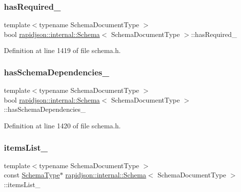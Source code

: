 \subsubsection{\texorpdfstring{hasRequired\_}{hasRequired\_}}
{\footnotesize\ttfamily template$<$typename Schema\+Document\+Type $>$ \\
bool \mbox{\hyperlink{classrapidjson_1_1internal_1_1_schema}{rapidjson\+::internal\+::\+Schema}}$<$ Schema\+Document\+Type $>$\+::has\+Required\+\_\+\hspace{0.3cm}{\ttfamily [private]}}



Definition at line 1419 of file schema.\+h.

\mbox{\label{classrapidjson_1_1internal_1_1_schema_ab366e6b69bfb9c9bce2899e845a7c7fd}} 
\subsubsection{\texorpdfstring{hasSchemaDependencies\_}{hasSchemaDependencies\_}}
{\footnotesize\ttfamily template$<$typename Schema\+Document\+Type $>$ \\
bool \mbox{\hyperlink{classrapidjson_1_1internal_1_1_schema}{rapidjson\+::internal\+::\+Schema}}$<$ Schema\+Document\+Type $>$\+::has\+Schema\+Dependencies\+\_\+\hspace{0.3cm}{\ttfamily [private]}}



Definition at line 1420 of file schema.\+h.

\mbox{\label{classrapidjson_1_1internal_1_1_schema_a6220c291625076038991645091f23398}} 
\subsubsection{\texorpdfstring{itemsList\_}{itemsList\_}}
{\footnotesize\ttfamily template$<$typename Schema\+Document\+Type $>$ \\
const \mbox{\hyperlink{classrapidjson_1_1internal_1_1_schema_a62e03be17971648a9d614244ffcb0f10}{Schema\+Type}}$\ast$ \mbox{\hyperlink{classrapidjson_1_1internal_1_1_schema}{rapidjson\+::internal\+::\+Schema}}$<$ Schema\+Document\+Type $>$\+::items\+List\+\_\+\hspace{0.3cm}{\ttfamily [private]}}



